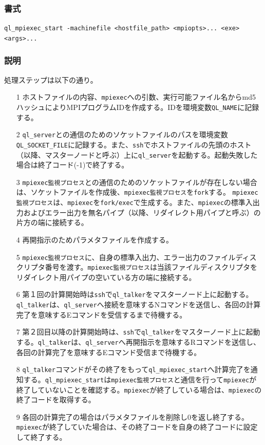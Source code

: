\documentclass[twoside,11pt,fleqn]{book}
\begin{document}
\subsubsection*{書式}{\quad} \texttt{ql\_mpiexec\_start -machinefile <hostfile\_path> {\lbrack}<mpiopts>...{\rbrack} <exe> {\lbrack}<args>...{\rbrack}}
\subsubsection*{説明}{\quad}
処理ステップは以下の通り。
\begin{itemize}
\item[1] ホストファイルの内容、\texttt{mpiexec}への引数、実行可能ファイル名からmd5ハッシュによりMPIプログラムIDを作成する。IDを環境変数\texttt{QL\_NAME}に記録する。
\item[2]\texttt{ql\_server}との通信のためのソケットファイルのパスを環境変数\texttt{QL\_SOCKET\_FILE}に記録する。また、\texttt{ssh}でホストファイルの先頭のホスト（以降、マスターノードと呼ぶ）上に\texttt{ql\_server}を起動する。起動失敗した場合は終了コード(-1)で終了する。
\item[3]  \texttt{mpiexec監視プロセス}との通信のためのソケットファイルが存在しない場合は、ソケットファイルを作成後、\texttt{mpiexec監視プロセス}を\texttt{fork}する。
\texttt{mpiexec監視プロセス}は、\texttt{mpiexec}を\texttt{fork/exec}で生成する。また、\texttt{mpiexec}の標準入出力およびエラー出力を無名パイプ（以降、リダイレクト用パイプと呼ぶ）の片方の端に接続する。
\item[4]
再開指示のためパラメタファイルを作成する。
\item[5]\texttt{mpiexec監視プロセス}に、自身の標準入出力、エラー出力のファイルディスクリプタ番号を渡す。\texttt{mpiexec監視プロセス}は当該ファイルディスクリプタをリダイレクト用パイプの空いている方の端に接続する。
\item[6]第１回の計算開始時は\texttt{ssh}で\texttt{ql\_talker}をマスターノード上に起動する。\texttt{ql\_talker}は、\texttt{ql\_server}へ接続を意味するNコマンドを送信し、各回の計算完了を意味するEコマンドを受信するまで待機する。
\item[7]第２回目以降の計算開始時は、\texttt{ssh}で\texttt{ql\_talker}をマスターノード上に起動する。\texttt{ql\_talker}は、\texttt{ql\_server}へ再開指示を意味するRコマンドを送信し、各回の計算完了を意味するEコマンド受信まで待機する。
\item[8] \texttt{ql\_talker}コマンドがその終了をもって\texttt{ql\_mpiexec\_start}へ計算完了を通知する。\texttt{ql\_mpiexec\_start}は\texttt{mpiexec監視プロセス}と通信を行って\texttt{mpiexec}が終了していないことを確認する。\texttt{mpiexec}が終了している場合は、\texttt{mpiexec}の終了コードを取得する。
\item[9]各回の計算完了の場合はパラメタファイルを削除し0を返し終了する。\texttt{mpiexec}が終了していた場合は、その終了コードを自身の終了コードに設定して終了する。
\end{itemize}
\end{document}
